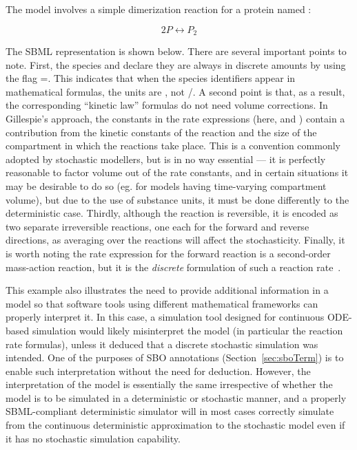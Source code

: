 The model involves a simple dimerization reaction for a protein
named :
\begin{linenomath}
\begin{equation*}
    2 P  \leftrightarrow  P_2
\end{equation*}
\end{linenomath}
The SBML representation is shown below.  There are several
important points to note.  First, the species  and 
declare they are always in discrete amounts by using the flag
=.  This indicates that
when the species identifiers appear in mathematical formulas, the
units are , not 
/.  A second point is that, as
a result, the corresponding ``kinetic law'' formulas do not need
volume corrections.  In Gillespie's approach, the constants in the
rate expressions (here,  and ) contain a
contribution from the kinetic constants of the reaction and the
size of the compartment in which the reactions take
place. This is a convention commonly adopted by stochastic
modellers, but is in no way essential --- it is perfectly
reasonable to factor volume out of the rate constants, and in
certain situations it may be desirable to do so (eg. for models having
time-varying compartment volume), but due to the use of substance
units, it must be done differently to the deterministic case.
Thirdly, although the reaction is reversible, it is encoded as two
separate irreversible reactions, one each for the forward and
reverse directions, as averaging over the reactions will affect
the stochasticity.
Finally, it is worth noting the rate expression for the forward
reaction is a second-order mass-action reaction, but it is the
\emph{discrete} formulation of such a reaction
rate~\citep{gillespie:1977}.


This example also illustrates the need to provide additional
information in a model so that software tools using different
mathematical frameworks can properly interpret it.  In this case,
a simulation tool designed for continuous ODE-based simulation
would likely misinterpret the model (in particular the reaction
rate formulas), unless it deduced that a discrete stochastic
simulation was intended.  One of the purposes of SBO annotations
(Section~\ref{sec:sboTerm}) is to enable such interpretation
without the need for deduction. However, the interpretation of the
model is essentially the same irrespective of whether the model is
to be simulated in a deterministic or stochastic manner, and a
properly SBML-compliant deterministic simulator will in most cases
correctly simulate from the continuous deterministic approximation
to the stochastic model even if it has no stochastic simulation
capability.

